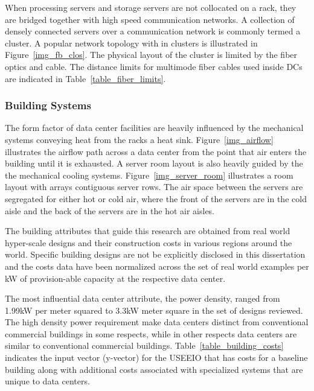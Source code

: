         
        
        When processing servers and storage servers are not collocated on a rack, they are bridged together with high speed communication networks. A collection of densely connected servers over a communication network is commonly termed a cluster. A popular network topology with in clusters is illustrated in Figure~\ref{img_fb_clos}. The physical layout of the cluster is limited by the fiber optics and cable. The distance limits for multimode fiber cables used inside DCs are indicated in Table~\ref{table_fiber_limits}.
        
        
        
        
        
        \subsubsection{Building Systems}
        
        The form factor of data center facilities are heavily influenced by the mechanical systems conveying heat from the racks a heat sink. Figure~\ref{img_airflow} illustrates the airflow path across a data center from the point that air enters the building until it is exhausted. A server room layout is also heavily guided by the the mechanical cooling systems. Figure~\ref{img_server_room} illustrates a room layout with arrays contiguous server rows. The air space between the servers are segregated for either hot or cold air, where the front of the servers are in the cold aisle and the back of the servers are in the hot air aisles. 
        
        
        
        
        The building attributes that guide this research are obtained from real world hyper-scale designs and their construction costs in various regions around the world. Specific building designs are not be explicitly disclosed in this dissertation and the costs data have been normalized across the set of real world examples per kW of provision-able capacity at the respective data center. 
        
        The most influential data center attribute, the power density, ranged from 1.99kW per meter squared to 3.3kW meter square in the set of designs reviewed. The high density power requirement make data centers distinct from conventional commercial buildings in some respects, while in other respects data centers are similar to conventional commercial buildings. Table~\ref{table_building_costs} indicates the input vector (y-vector) for the USEEIO that has costs for a baseline building along with additional costs associated with specialized systems that are unique to data centers.
        
